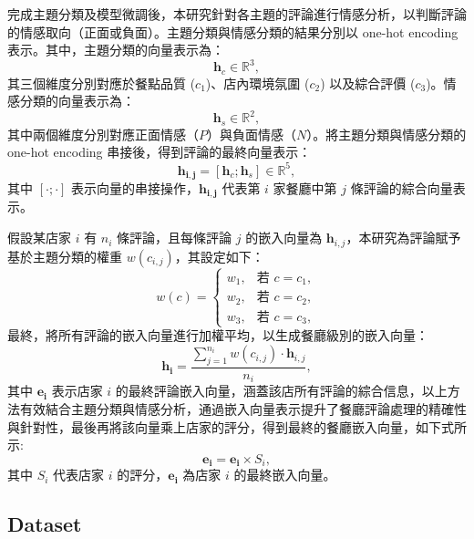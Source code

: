         完成主題分類及模型微調後，本研究針對各主題的評論進行情感分析，以判斷評論的情感取向（正面或負面）。主題分類與情感分類的結果分別以 one-hot encoding 表示。其中，主題分類的向量表示為：
        \begin{equation}
            \mathbf{h}_c \in \mathbb{R}^3,
        \end{equation}
        其三個維度分別對應於餐點品質 (\(c_1\))、店內環境氛圍 (\(c_2\)) 以及綜合評價 (\(c_3\))。情感分類的向量表示為：
        \begin{equation}
            \mathbf{h}_s \in \mathbb{R}^2,
        \end{equation}
        其中兩個維度分別對應正面情感（\(P\)）與負面情感（\(N\)）。將主題分類與情感分類的 one-hot encoding 串接後，得到評論的最終向量表示：
        \begin{equation}
            \mathbf{h_{i,j}} = [\mathbf{h}_c; \mathbf{h}_s] \in \mathbb{R}^5,
        \end{equation}
        其中 \([\cdot; \cdot]\) 表示向量的串接操作，\(\mathbf{h_{i,j}}\) 代表第 \(i\) 家餐廳中第 \(j\) 條評論的綜合向量表示。
        
        假設某店家 \(i\) 有 \(n_i\) 條評論，且每條評論 \(j\) 的嵌入向量為 \(\mathbf{h}_{i,j}\)，本研究為評論賦予基於主題分類的權重 \(w(c_{i,j})\)，其設定如下：
        \begin{equation}
            w(c) =
            \begin{cases}
            w_{1}, & \text{若 } c = c_1, \\
            w_{2}, & \text{若 } c = c_2, \\
            w_{3}, & \text{若 } c = c_3,
            \end{cases}
        \end{equation}
        最終，將所有評論的嵌入向量進行加權平均，以生成餐廳級別的嵌入向量：
        \begin{equation}
            \mathbf{h_i} = \frac{\sum_{j=1}^{n_i} w(c_{i,j}) \cdot \mathbf{h}_{i,j}}{n_i},
        \end{equation}
        其中 \(\mathbf{e_i}\) 表示店家 \(i\) 的最終評論嵌入向量，涵蓋該店所有評論的綜合信息，以上方法有效結合主題分類與情感分析，通過嵌入向量表示提升了餐廳評論處理的精確性與針對性，最後再將該向量乘上店家的評分，得到最終的餐廳嵌入向量，如下式所示:
        \begin{equation}
            \mathbf{e_i} = \mathbf{e_i} \times S_i,
        \end{equation}
        其中 \(S_i\) 代表店家 \(i\) 的評分，\(\mathbf{e_i}\) 為店家 \(i\) 的最終嵌入向量。
        


    \subsection{Dataset}

        
\color{black}